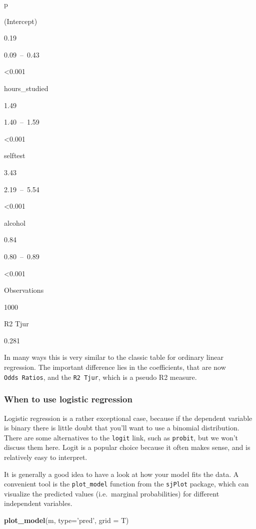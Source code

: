 \documentclass[
]{article}
\newenvironment{Shaded}{\begin{snugshade}}{\end{snugshade}}
\newcommand{\DataTypeTok}[1]{\textcolor[rgb]{0.13,0.29,0.53}{#1}}
\newcommand{\KeywordTok}[1]{\textcolor[rgb]{0.13,0.29,0.53}{\textbf{#1}}}
\newcommand{\NormalTok}[1]{#1}
\newcommand{\StringTok}[1]{\textcolor[rgb]{0.31,0.60,0.02}{#1}}
\begin{document}
p

(Intercept)

0.19

0.09~--~0.43

\textless0.001

hours\_studied

1.49

1.40~--~1.59

\textless0.001

selftest

3.43

2.19~--~5.54

\textless0.001

alcohol

0.84

0.80~--~0.89

\textless0.001

Observations

1000

R2 Tjur

0.281

In many ways this is very similar to the classic table for ordinary
linear regression. The important difference lies in the coefficients,
that are now \texttt{Odds\ Ratios}, and the \texttt{R2\ Tjur}, which is
a pseudo R2 measure.

\hypertarget{when-to-use-logistic-regression}{%
\subsubsection{When to use logistic
regression}\label{when-to-use-logistic-regression}}

Logistic regression is a rather exceptional case, because if the
dependent variable is binary there is little doubt that you'll want to
use a binomial distribution. There are some alternatives to the
\texttt{logit} link, such as \texttt{probit}, but we won't discuss them
here. Logit is a popular choice because it often makes sense, and is
relatively easy to interpret.

It is generally a good idea to have a look at how your model fits the
data. A convenient tool is the \texttt{plot\_model} function from the
\texttt{sjPlot} package, which can visualize the predicted values
(i.e.~marginal probabilities) for different independent variables.

\begin{Shaded}
\begin{Highlighting}[]
\KeywordTok{plot_model}\NormalTok{(m, }\DataTypeTok{type=}\StringTok{'pred'}\NormalTok{, }\DataTypeTok{grid =}\NormalTok{ T)}
\end{Highlighting}
\end{Shaded}
\end{document}
